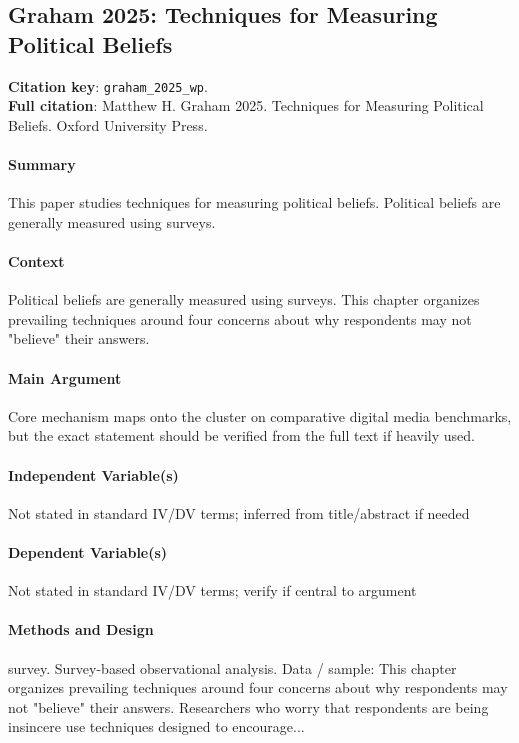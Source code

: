 \documentclass[12pt]{article}
\begin{document}
\subsection{Graham 2025: Techniques for Measuring Political Beliefs}
\textbf{Citation key}: \texttt{graham\_2025\_wp}.\\
\textbf{Full citation}: Matthew H. Graham 2025. Techniques for Measuring Political Beliefs. Oxford University Press.

\paragraph{Summary} This paper studies techniques for measuring political beliefs. Political beliefs are generally measured using surveys.

\paragraph{Context} Political beliefs are generally measured using surveys. This chapter organizes prevailing techniques around four concerns about why respondents may not "believe" their answers.

\paragraph{Main Argument} Core mechanism maps onto the cluster on comparative digital media benchmarks, but the exact statement should be verified from the full text if heavily used.

\paragraph{Independent Variable(s)} Not stated in standard IV/DV terms; inferred from title/abstract if needed

\paragraph{Dependent Variable(s)} Not stated in standard IV/DV terms; verify if central to argument

\paragraph{Methods and Design} survey. Survey-based observational analysis. Data / sample: This chapter organizes prevailing techniques around four concerns about why respondents may not "believe" their answers. Researchers who worry that respondents are being insincere use techniques designed to encourage...
\end{document}
